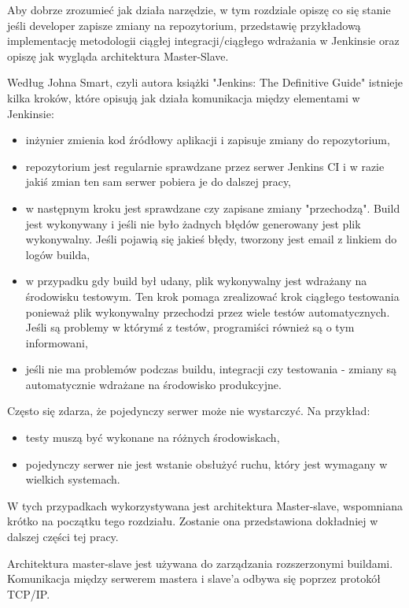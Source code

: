 Aby dobrze zrozumieć jak działa narzędzie, w tym rozdziale opiszę co się stanie jeśli developer zapisze zmiany na repozytorium, przedstawię przykładową implementację metodologii ciągłej integracji/ciągłego wdrażania w Jenkinsie oraz opiszę jak wygląda architektura Master-Slave.

Według Johna Smart, czyli autora książki "Jenkins: The Definitive Guide" istnieje kilka kroków, które opisują jak działa komunikacja między elementami w Jenkinsie: 
\begin{itemize}
    \item inżynier zmienia kod źródłowy aplikacji i zapisuje zmiany do repozytorium,
    \item repozytorium jest regularnie sprawdzane przez serwer Jenkins CI i w razie jakiś zmian ten sam serwer pobiera je do dalszej pracy,
    \item w następnym kroku jest sprawdzane czy zapisane zmiany "przechodzą". Build  jest wykonywany i jeśli nie było żadnych błędów generowany jest plik wykonywalny. Jeśli pojawią się jakieś błędy, tworzony jest email z linkiem do logów builda,
    \item w przypadku gdy build był udany, plik wykonywalny jest wdrażany na środowisku testowym. Ten krok pomaga zrealizować krok ciągłego testowania ponieważ plik wykonywalny przechodzi przez wiele testów automatycznych. Jeśli są problemy w którymś z testów, programiści również są o tym informowani,
    \item jeśli nie ma problemów podczas buildu, integracji czy testowania - zmiany są automatycznie wdrażane na środowisko produkcyjne.
\end{itemize}



Często się zdarza, że pojedynczy serwer może nie wystarczyć. Na przykład:
\begin{itemize}
    \item testy muszą być wykonane na różnych środowiskach,
    \item pojedynczy serwer nie jest wstanie obsłużyć ruchu, który jest wymagany w wielkich systemach.
\end{itemize}

W tych przypadkach wykorzystywana jest architektura Master-slave, wspomniana krótko na początku tego rozdziału. Zostanie ona przedstawiona dokładniej w dalszej części tej pracy. 

Architektura master-slave jest używana do zarządzania rozszerzonymi buildami. Komunikacja między serwerem mastera i slave'a odbywa się poprzez protokół TCP/IP. 

